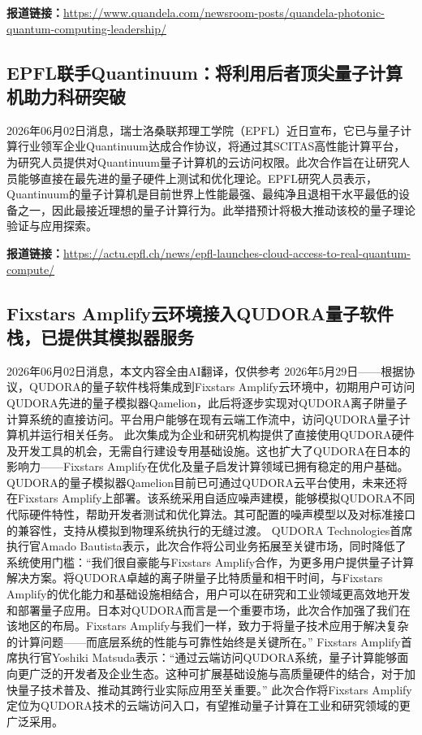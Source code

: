 \documentclass[12pt,a4paper]{ctexart}
\begin{document}
\noindent\textbf{报道链接：}\url{https://www.quandela.com/newsroom-posts/quandela-photonic-quantum-computing-leadership/}

\subsection{ EPFL联手Quantinuum：将利用后者顶尖量子计算机助力科研突破 }

2026年06月02日消息，瑞士洛桑联邦理工学院（EPFL）近日宣布，它已与量子计算行业领军企业Quantinuum达成合作协议，将通过其SCITAS高性能计算平台，为研究人员提供对Quantinuum量子计算机的云访问权限。此次合作旨在让研究人员能够直接在最先进的量子硬件上测试和优化理论。EPFL研究人员表示，Quantinuum的量子计算机是目前世界上性能最强、最纯净且退相干水平最低的设备之一，因此最接近理想的量子计算行为。此举措预计将极大推动该校的量子理论验证与应用探索。

\noindent\textbf{报道链接：}\url{https://actu.epfl.ch/news/epfl-launches-cloud-access-to-real-quantum-compute/}

\subsection{ Fixstars Amplify云环境接入QUDORA量子软件栈，已提供其模拟器服务 }

2026年06月02日消息，本文内容全由AI翻译，仅供参考
2026年5月29日——根据协议，QUDORA的量子软件栈将集成到Fixstars Amplify云环境中，初期用户可访问QUDORA先进的量子模拟器Qamelion，此后将逐步实现对QUDORA离子阱量子计算系统的直接访问。平台用户能够在现有云端工作流中，访问QUDORA量子计算机并运行相关任务。
此次集成为企业和研究机构提供了直接使用QUDORA硬件及开发工具的机会，无需自行建设专用基础设施。这也扩大了QUDORA在日本的影响力——Fixstars Amplify在优化及量子启发计算领域已拥有稳定的用户基础。
QUDORA的量子模拟器Qamelion目前已可通过QUDORA云平台使用，未来还将在Fixstars Amplify上部署。该系统采用自适应噪声建模，能够模拟QUDORA不同代际硬件特性，帮助开发者测试和优化算法。其可配置的噪声模型以及对标准接口的兼容性，支持从模拟到物理系统执行的无缝过渡。
QUDORA Technologies首席执行官Amado Bautista表示，此次合作将公司业务拓展至关键市场，同时降低了系统使用门槛：“我们很自豪能与Fixstars Amplify合作，为更多用户提供量子计算解决方案。将QUDORA卓越的离子阱量子比特质量和相干时间，与Fixstars Amplify的优化能力和基础设施相结合，用户可以在研究和工业领域更高效地开发和部署量子应用。日本对QUDORA而言是一个重要市场，此次合作加强了我们在该地区的布局。Fixstars Amplify与我们一样，致力于将量子技术应用于解决复杂的计算问题——而底层系统的性能与可靠性始终是关键所在。”
Fixstars Amplify首席执行官Yoshiki Matsuda表示：“通过云端访问QUDORA系统，量子计算能够面向更广泛的开发者及企业生态。这种可扩展基础设施与高质量硬件的结合，对于加快量子技术普及、推动其跨行业实际应用至关重要。”
此次合作将Fixstars Amplify定位为QUDORA技术的云端访问入口，有望推动量子计算在工业和研究领域的更广泛采用。
\end{document}
